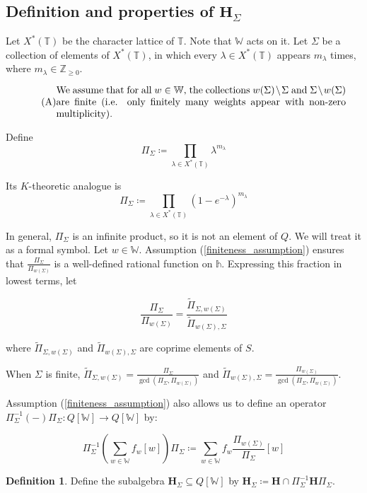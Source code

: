 \documentclass[11pt]{article}
\newcommand{\Z}{\mathbb{Z}}
\renewcommand{\H}{\textbf{H}}
\newcommand{\1}{\mathbb{1}}
\renewcommand{\th}{\mathbb{h}}
\newcommand{\tW}{\mathbb{W}}
\newcommand{\tT}{\mathbb{T}}
\newcommand{\tPi}{\widetilde{\Pi}}
\renewcommand{\subset}{\subseteq}
\theoremstyle{definition}
\newtheorem{definition}[theorem]{Definition}
\numberwithin{equation}{section}
\begin{document}
\subsection*{Definition and properties of $\H_\Sigma$}

Let $X^*(\tT)$ be the character lattice of $\tT$. Note that $\tW$ acts on it. Let $\Sigma$ be a collection of elements of $X^*(\tT)$, in which every $\lambda \in X^*(\tT)$ appears $m_\lambda$ times, where $m_\lambda \in \Z_{\geq 0}$. 

\begin{equation}
\label{finiteness_assumption}
\tag{A}
\parbox{0.85\textwidth}{We assume that for all $w\in \tW$, the collections $w(\Sigma) \setminus \Sigma$ and $\Sigma \setminus w(\Sigma)$ are finite (i.e. only finitely many weights appear with non-zero multiplicity).}
\end{equation}

\noindent Define
$$\Pi_\Sigma \coloneqq \prod_{\lambda \in X^*(\tT)} \lambda^{m_\lambda}$$

\noindent Its $K$-theoretic analogue is
$$\varPi_\Sigma\coloneqq \prod_{\lambda \in X^*(\tT)} (1-e^{-\lambda})^{m_\lambda}$$

\noindent In general, $\Pi_\Sigma$ is an infinite product, so it is not an element of $Q$. We will treat it as a formal symbol. Let $w\in \tW$. Assumption (\ref{finiteness_assumption}) ensures that $\frac{\Pi_\Sigma}{\Pi_{w(\Sigma)}}$ is a well-defined rational function on $\th$. Expressing this fraction in lowest terms, let

$$\frac{\Pi_\Sigma}{\Pi_{w(\Sigma)}} = \frac{\tPi_{\Sigma, w(\Sigma)}}{\tPi_{w(\Sigma), \Sigma}}$$

\noindent where $\tPi_{\Sigma, w(\Sigma)}$ and  $\tPi_{w(\Sigma), \Sigma}$ are coprime elements of $S$. 

\noindent When $\Sigma$ is finite, $\tPi_{\Sigma, w(\Sigma)} = \frac{\Pi_\Sigma}{\gcd(\Pi_\Sigma, \Pi_{w(\Sigma)})}$ and $\tPi_{w(\Sigma), \Sigma} = \frac{\Pi_{w(\Sigma)}}{\gcd(\Pi_\Sigma, \Pi_{w(\Sigma)})}$.

Assumption (\ref{finiteness_assumption}) also allows us to define an operator $\Pi_\Sigma^{-1} (-) \Pi_\Sigma : Q[\tW] \rightarrow Q[\tW]$ by:

$$\Pi_\Sigma^{-1} \left(\sum_{w\in \tW} f_w [w]\right) \Pi_\Sigma \coloneqq \sum_{w\in \tW} f_w \frac{\Pi_{w(\Sigma)}}{\Pi_\Sigma}[w]$$

\begin{definition}
    Define the subalgebra $\H_\Sigma \subset Q[\tW]$ by $\H_\Sigma \coloneqq \H \cap \Pi_\Sigma^{-1} \H \Pi_\Sigma$.
\end{definition}
\end{document}
